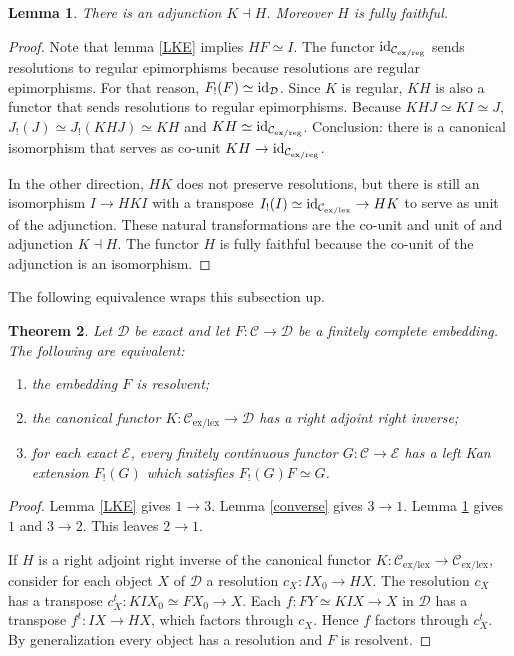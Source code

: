 \documentclass[sort&compress]{elsarticle}
\theoremstyle{plain}
\newtheorem{theorem}{Theorem}
\newtheorem{lemma}[theorem]{Lemma}
\theoremstyle{definition}
\theoremstyle{remark}
\newcommand\hide[1]{}
\newcommand\cat\mathcal
\newcommand\exlex{_\mathrm{ex/lex}}\newcommand\exreg{_\mathrm{ex/reg}}
\begin{document}
\begin{lemma} There is an adjunction $K\dashv H$. Moreover $H$ is fully faithful. \label{adjunct} \end{lemma}

\begin{proof} \hide{Apply the adjoint functor theorem to $K$!  Can't! $K$ is not fully faithful! }
Note that lemma \ref{LKE} implies $HF\simeq I$. 
The functor $\id_{\cat C\exreg}$ sends resolutions to regular epimorphisms because resolutions are regular epimorphisms. For that reason, $F_!(F)\simeq \id_{\cat D}$. 
Since $K$ is regular, $KH$ is also a functor that sends resolutions to regular epimorphisms. Because $KHJ\simeq KI\simeq J$, $J_!(J) \simeq J_!(KHJ)\simeq KH$ and $KH\simeq \id_{\cat C\exreg}$. Conclusion: there is a canonical isomorphism that serves as co-unit $KH \to \id_{\cat C\exreg}$.

In the other direction, $HK$ does not preserve resolutions, but there is still an isomorphism $I \to HKI$ with a transpose $I_!(I)\simeq \id_{\cat C\exlex} \to HK$ to serve as unit of the adjunction.
These natural transformations are the co-unit and unit of and adjunction $K\dashv H$. The functor $H$ is fully faithful because the co-unit of the adjunction is an isomorphism.%
\end{proof}

The following equivalence wraps this subsection up.

\begin{theorem} Let $\cat D$ be exact and let $F:\cat C\to\cat D$ be a finitely complete embedding. The following are equivalent:
\begin{enumerate}
\item the embedding $F$ is resolvent;
\item the canonical functor $K:\cat C\exlex \to \cat D$ has a right adjoint right inverse;
\item for each exact $\cat E$, every finitely continuous functor $G:\cat C \to \cat E$ has a left Kan extension $F_!(G)$ which satisfies $F_!(G)F\simeq G$.
\end{enumerate}\label{ThA}
\end{theorem}

\begin{proof} Lemma \ref{LKE} gives $1\to 3$. Lemma \ref{converse} gives $3\to 1$. Lemma \ref{adjunct} gives $1$ and $3\to 2$. This leaves $2\to 1$.

If $H$ is a right adjoint right inverse of the canonical functor $K:\cat C\exlex \to \cat C\exlex$, consider for each object $X$ of $\cat D$ a resolution $c_X:IX_0 \to HX$. The resolution $c_X$ has a transpose $c_X^t:KIX_0 \simeq FX_0 \to X$. Each $f:FY\simeq KIX \to X$ in $\cat D$ has a transpose $f^t: IX \to HX$, which factors through $c_X$. Hence $f$ factors through $c_X^t$. By generalization every object has a resolution and $F$ is resolvent.
\end{proof}
\end{document}
